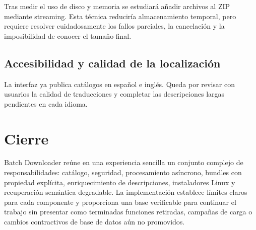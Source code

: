 Tras medir el uso de disco y memoria se estudiará añadir archivos al ZIP mediante streaming. Esta técnica reduciría almacenamiento temporal, pero requiere resolver cuidadosamente los fallos parciales, la cancelación y la imposibilidad de conocer el tamaño final.

\subsection{Accesibilidad y calidad de la localización}

La interfaz ya publica catálogos en español e inglés. Queda por revisar con usuarios la calidad de traducciones y completar las descripciones largas pendientes en cada idioma.

\section{Cierre}

Batch Downloader reúne en una experiencia sencilla un conjunto complejo de responsabilidades: catálogo, seguridad, procesamiento asíncrono, bundles con propiedad explícita, enriquecimiento de descripciones, instaladores Linux y recuperación semántica degradable. La implementación establece límites claros para cada componente y proporciona una base verificable para continuar el trabajo sin presentar como terminadas funciones retiradas, campañas de carga o cambios contractivos de base de datos aún no promovidos.
